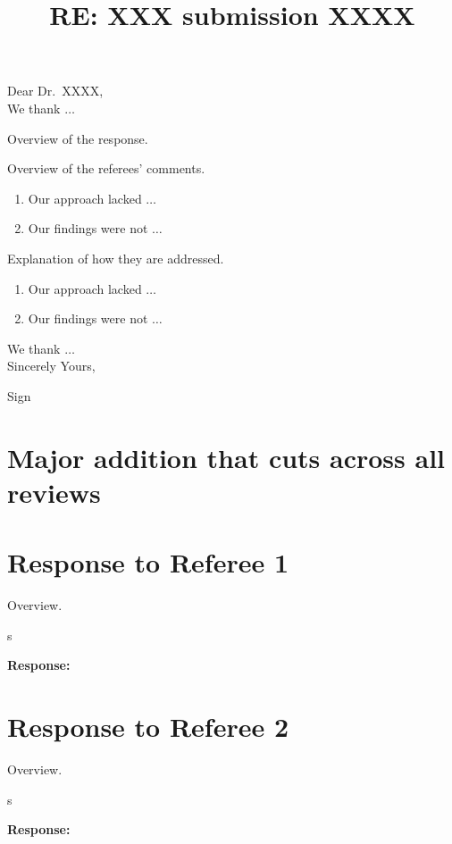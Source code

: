 \documentclass[12pt]{article}
\title{RE: XXX submission XXXX}
\date{}
\makeatletter
\newcommand{\response}[1]{{\noindent \textbf{Response:} \\ \noindent #1}}
\newcommand{\rcomment}[1]{%
\vspace{10pt}
\begin{sectionbox}
s #1
\end{sectionbox}
}
\renewcommand{\maketitle}{\bgroup\setlength{\parindent}{0pt}
\begin{flushleft}
\Large  \textbf{\@title}
\end{flushleft}\egroup
}
\makeatother
\begin{document}
\maketitle

\bigskip
\noindent Dear Dr.~XXXX, \\

We thank $\dots$ 

Overview of the response.

Overview of the referees' comments.


\begin{enumerate}
    \itemsep0em
    \item Our approach lacked $\dots$ 
    \item Our findings were not $\dots$ 
\end{enumerate}

Explanation of how they are addressed. 


\begin{enumerate}
    \itemsep0em
    \item Our approach lacked $\dots$ 
    \item Our findings were not $\dots$ 
\end{enumerate}

We thank $\dots$ \\

Sincerely Yours,

Sign

\listoftodos


\clearpage
\tableofcontents
\clearpage


\section{Major addition that cuts across all reviews}\label{sec:major}

\lipsum[1]{} 


%
%
\clearpage
\section{Response to Referee 1}

Overview. 

\rcomment{%
\lipsum[1]{} 
}

\response{%
\lipsum[1]{}
}

%
%
\clearpage
\section{Response to Referee 2}

Overview. 

\rcomment{%
\lipsum[1]{} 
}

\response{%
\lipsum[1]{}
}

%
%
\clearpage
\printbibliography{}
\end{document}
